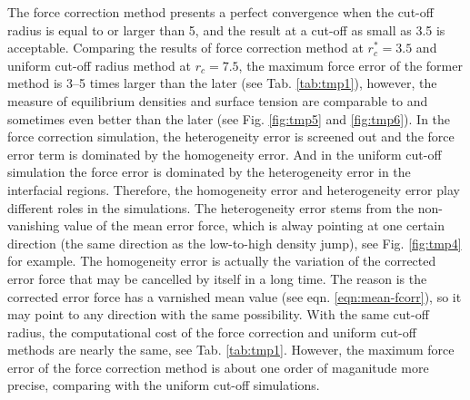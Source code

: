 \documentclass[aps,pre,preprint]{revtex4}
\begin{document}
The force correction method presents a perfect convergence when the
cut-off radius is equal to or larger than 5, and the result at a
cut-off as small as 3.5 is acceptable. Comparing the results of force
correction method at $r_c^\ast = 3.5$ and uniform cut-off radius
method at $r_c = 7.5$, the maximum force error of the former method is
3--5 times larger than the later (see Tab. \ref{tab:tmp1}), however,
the measure of equilibrium densities and surface tension are
comparable to and sometimes even better than the later (see
Fig. \ref{fig:tmp5} and \ref{fig:tmp6}). In the force correction
simulation, the heterogeneity error is screened out and the force
error term is dominated by the homogeneity error. And in the uniform
cut-off simulation the force error is dominated by the heterogeneity
error in the interfacial regions. Therefore, the homogeneity error and
heterogeneity error play different roles in the simulations.  The
heterogeneity error stems from the non-vanishing value of the mean
error force, which is alway pointing at one certain direction (the
same direction as the low-to-high density jump), see
Fig. \ref{fig:tmp4} for example. The homogeneity error is actually the
variation of the corrected error force that may be cancelled by itself
in a long time. The reason is the corrected error force has a
varnished mean value (see eqn. \eqref{eqn:mean-fcorr}), so it may
point to any direction with the same possibility.  With the same
cut-off radius, the computational cost of the force correction and
uniform cut-off methods are nearly the same, see
Tab. \ref{tab:tmp1}. However, the maximum force error of the force
correction method is about one order of maganitude more precise,
comparing with the uniform cut-off simulations.
\end{document}
